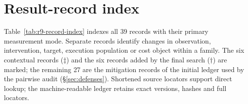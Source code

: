\section{Result-record index}\label{app:records}
Table~\ref{tab:r9-record-index} indexes all 39 records with their primary measurement mode. Separate records identify changes in observation, intervention, target, execution population or cost object within a family. The six contextual records ($\ddagger$) and the six records added by the final search ($\dagger$) are marked; the remaining 27 are the mitigation records of the initial ledger used by the pairwise audit (\S\ref{sec:defenses}). Shortened source locators support direct lookup; the machine-readable ledger retains exact versions, hashes and full locators.
